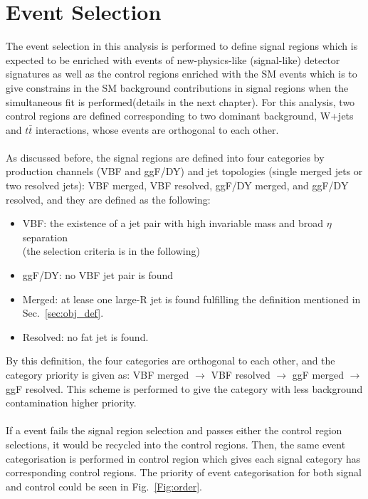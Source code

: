 \section{Event Selection}
The event selection in this analysis is performed to define signal regions which is expected to be enriched with events of new-physics-like (signal-like) detector signatures as well as the control regions enriched with the SM events which is to give constrains in the SM background contributions in signal regions when the simultaneous fit is performed(details in the next chapter). For this analysis, two control regions are defined corresponding to two dominant background, W+jets and $t\bar{t}$ interactions, whose events are orthogonal to each other.  
\\
\\As discussed before, the signal regions are defined into four categories by production channels (VBF and ggF/DY) and jet topologies (single merged jets or two resolved jets): VBF merged, VBF resolved, ggF/DY merged, and ggF/DY resolved, and they are defined as the following:
\begin{itemize}
	\item VBF: the existence of a jet pair with high invariable mass and broad $\eta$ separation \\(the selection criteria is in the following) 
	\item ggF/DY: no VBF jet pair is found
	\item Merged: at lease one large-R jet is found fulfilling the definition mentioned in Sec.~\ref{sec:obj_def}.
	\item Resolved: no fat jet is found. 
\end{itemize}
By this definition, the four categories are orthogonal to each other, and the category priority is given as:
VBF merged $\to$ VBF resolved $\to$ ggF merged $\to$ ggF resolved. This scheme is performed to give the category with less background contamination higher priority.
\\
\\If a event fails the signal region selection and passes either  the control region selections, it would be recycled into the control regions. Then, the same event categorisation is performed in control region which gives each signal category has corresponding control regions. The priority of event categorisation for both signal and control could be seen in Fig.~\ref{Fig:order}.
